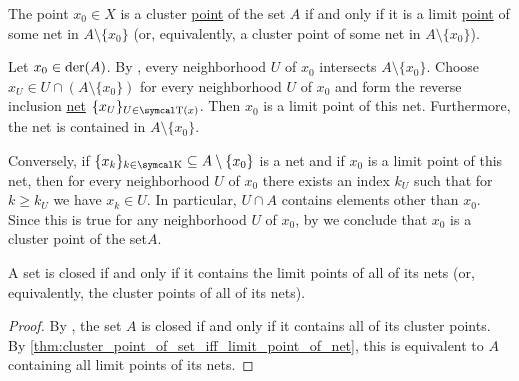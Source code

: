 \begin{Proposition}\label{thm:cluster_point_of_set_iff_limit_point_of_net}
  The point \( x_0 \in X \) is a cluster \hyperref[def:topological_derived_set/cluster_point]{point} of the set \( A \) if and only if it is a limit \hyperref[def:net_convergence/cluster]{point} of some net in \( A \setminus \{ x_0 \} \) (or, equivalently, a cluster point of some net in \( A \setminus \{ x_0 \} \)).
\end{Proposition}
\begin{RefListProof}
    \ISufficiency Let \( x_0 \in \operatorname{der}(A) \). By , every neighborhood \( U \) of \( x_0 \) intersects \( A \setminus \{ x_0 \} \). Choose\LEM \( x_U \in U \cap (A \setminus \{ x_0 \}) \) for every neighborhood \( U \) of \( x_0 \) and form the reverse inclusion \hyperref[ex:reverse_inclusion_net]{net} \( \{ x_U \}_{U \in \CT(x)} \). Then \( x_0 \) is a limit point of this net. Furthermore, the net is contained in \( A \setminus \{ x_0 \} \).

    \INecessity Conversely, if \( \{ x_k \}_{k \in \CK} \subseteq A \setminus \{ x_0 \} \) is a net and if \( x_0 \) is a limit point of this net, then for every neighborhood \( U \) of \( x_0 \) there exists an index \( k_U \) such that for \( k \geq k_U \) we have \(  x_k \in U \). In particular, \( U \cap A \) contains elements other than \( x_0 \). Since this is true for any neighborhood \( U \) of \( x_0 \), by  we conclude that \( x_0 \) is a cluster point of the set\( A \).
\end{RefListProof}

\begin{Corollary}\label{thm:closed_iff_contains_all_net_cluster_points}
  A set is closed if and only if it contains the limit points of all of its nets (or, equivalently, the cluster points of all of its nets).
\end{Corollary}
\begin{proof}
  By , the set \( A \) is closed if and only if it contains all of its cluster points. By \cref{thm:cluster_point_of_set_iff_limit_point_of_net}, this is equivalent to \( A \) containing all limit points of its nets.
\end{proof}

